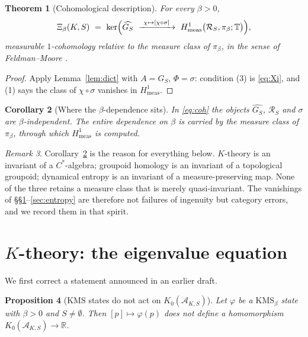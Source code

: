 \documentclass[11pt]{amsart}
\numberwithin{equation}{section}
\newtheorem{theorem}{Theorem}[section]
\newtheorem{proposition}[theorem]{Proposition}
\newtheorem{corollary}[theorem]{Corollary}
\theoremstyle{definition}
\theoremstyle{remark}
\newtheorem{remark}[theorem]{Remark}
\newcommand{\R}{\mathbb{R}}
\newcommand{\T}{\mathbb{T}}
\newcommand{\cA}{\mathcal{A}}
\newcommand{\cR}{\mathcal{R}}
\begin{document}
\begin{theorem}[Cohomological description]\label{thm:meas}
For every $\beta>0$,
\begin{equation}\label{eq:coh}
\Xi_\beta(K,S)\ =\ \ker\Bigl(\widehat{G_S}\ \xrightarrow{\ \chi\mapsto[\chi\circ\sigma]\ }\ H^1_{\mathrm{meas}}\bigl(\cR_S,\pi_\beta;\T\bigr)\Bigr),
\end{equation}
measurable $1$-cohomology relative to the measure class of $\pi_\beta$, in the sense of
Feldman--Moore \cite{FM}.
\end{theorem}

\begin{proof}
Apply Lemma~\ref{lem:dict} with $A=G_S$, $\Phi=\sigma$: condition (3) is \eqref{eq:Xi}, and
(1) says the class of $\chi\circ\sigma$ vanishes in $H^1_{\mathrm{meas}}$.
\end{proof}

\begin{corollary}[Where the $\beta$-dependence sits]\label{cor:where}
In \eqref{eq:coh} the objects $\widehat{G_S}$, $\cR_S$ and $\sigma$ are $\beta$-independent.
The entire dependence on $\beta$ is carried by the measure class of $\pi_\beta$, through
which $H^1_{\mathrm{meas}}$ is computed.
\end{corollary}

\begin{remark}\label{rem:category}
Corollary~\ref{cor:where} is the reason for everything below. $K$-theory is an invariant of
a $C^*$-algebra; groupoid homology is an invariant of a topological groupoid; dynamical
entropy is an invariant of a measure-preserving map. None of the three retains a measure
class that is merely quasi-invariant. The vanishings of
\S\S\ref{sec:Ktheory}--\ref{sec:entropy} are therefore not failures of ingenuity but
category errors, and we record them in that spirit.
\end{remark}

\section{$K$-theory: the eigenvalue equation}\label{sec:Ktheory}

We first correct a statement announced in an earlier draft.

\begin{proposition}[KMS states do not act on $K_0(\cA_{K,S})$]\label{prop:notrace}
Let $\varphi$ be a $\mathrm{KMS}_\beta$ state with $\beta>0$ and $S\ne\emptyset$. Then
$[p]\mapsto\varphi(p)$ does \emph{not} define a homomorphism $K_0(\cA_{K,S})\to\R$.
\end{proposition}
\end{document}
